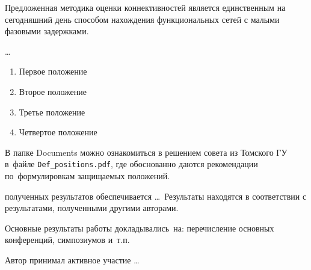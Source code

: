{\influence} 
Предложенная методика оценки коннективностей является единственным
на сегодняшний день способом нахождения функциональных сетей с малыми
фазовыми задержками.

{\methods} \ldots

{}
\begin{enumerate}
  \item Первое положение
  \item Второе положение
  \item Третье положение
  \item Четвертое положение
\end{enumerate}
В папке Documents можно ознакомиться в решением совета из Томского ГУ
в~файле \verb+Def_positions.pdf+, где обоснованно даются рекомендации
по~формулировкам защищаемых положений.

{\reliability} полученных результатов обеспечивается \ldots \ Результаты находятся в соответствии с результатами, полученными другими авторами.


{\probation}
Основные результаты работы докладывались~на:
перечисление основных конференций, симпозиумов и~т.\:п.

{\contribution} Автор принимал активное участие \ldots


